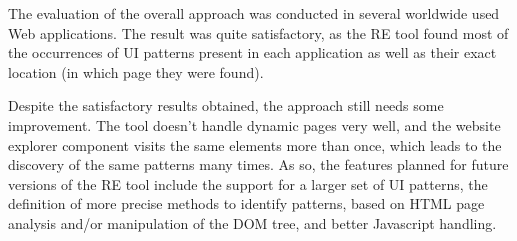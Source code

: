 \documentclass[conference]{IEEEtran}
\begin{document}
The evaluation of the overall approach was conducted in several worldwide used Web applications. The result was quite satisfactory, as the RE tool found most of the occurrences of UI patterns present in each application as well as their exact location (in which page they were found).

Despite the satisfactory results obtained, the approach still needs some improvement. The tool doesn't handle dynamic pages very well, and the website explorer component visits the same elements more than once, which leads to the discovery of the same patterns many times. As so, the features planned for future versions of the RE tool include the support for a larger set of UI patterns, the definition of more precise methods to identify patterns, based on HTML page analysis and/or manipulation of the DOM tree, and better Javascript handling.

 




\end{document}

